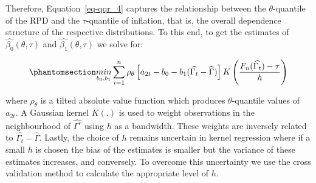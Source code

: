 \documentclass[
  letterpaper,
  DIV=11,
  numbers=noendperiod]{scrartcl}
\begin{document}
Therefore, Equation~\ref{eq-qqr_4} captures the relationship between the
\(\theta\)-quantile of the RPD and the \(\tau\)-quantile of inflation,
that is, the overall dependence structure of the respective
distributions. To this end, to get the estimates of
\(\hat{\beta_0}(\theta, \tau)\) and \(\hat{\beta_1}(\theta, \tau)\) we
solve for:

\begin{equation}\phantomsection\label{eq-qqr_5}{
    \underset{b_0, b_1}{min}\sum_{i=1}^n\rho_{\theta}\left[a_{2t} - b_0 - b_1(\widehat{\Gamma_t} - \widehat{\Gamma}) \right]K\left(\dfrac{F_n(\widehat{\Gamma_t}) - \tau}{h}\right)
}\end{equation}

where \(\rho_{\theta}\) is a tilted absolute value function which
produces \(\theta\)-quantile values of \(a_{2t}\). A Gaussian kernel
\(K(.)\) is used to weight observations in the neighbourhood of
\(\widehat{\Gamma^\tau}\) using \(h\) as a bandwidth. These weights are
inversely related to \(\widehat{\Gamma_t} - \widehat{\Gamma}\). Lastly,
the choice of \(h\) remains uncertain in kernel regression where if a
small \(h\) is chosen the bias of the estimates is smaller but the
variance of these estimates increases, and conversely. To overcome this
uncertainty we use the cross validation method to calculate the
appropriate level of \(h\).
\end{document}
